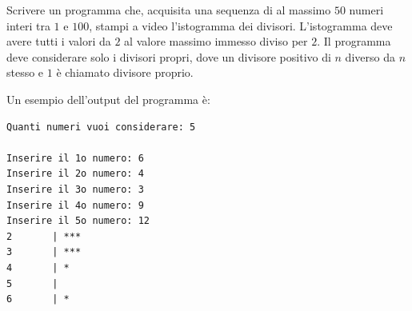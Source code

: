 \begin{Exercise}[label={ex:isto_divisori}]
	Scrivere un programma che, acquisita una sequenza di al massimo $50$ numeri interi tra $1$ e $100$, stampi a video l'istogramma dei divisori. L'istogramma deve avere tutti i valori da $2$ al valore massimo immesso diviso per $2$. Il programma deve considerare solo i divisori propri, dove un divisore positivo di $n$ diverso da $n$ stesso e  $1$ \`e chiamato divisore proprio.

	Un esempio dell'output del programma \`e:
\begin{lstlisting}[style=console]
Quanti numeri vuoi considerare: 5

Inserire il 1o numero: 6
Inserire il 2o numero: 4
Inserire il 3o numero: 3
Inserire il 4o numero: 9
Inserire il 5o numero: 12
2		| ***
3		| ***
4		| *
5		| 
6		| *
\end{lstlisting}
\end{Exercise}

\begin{Answer}[ref={ex:isto_divisori}]
  
\end{Answer}

